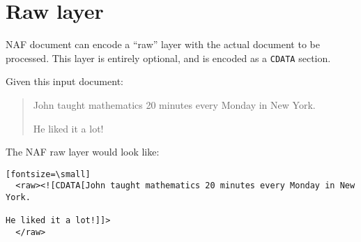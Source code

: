 
\section{Raw layer}
\label{sec:raw-layer}

NAF document can encode a ``raw'' layer with the actual document to be
processed. This layer is entirely optional, and is encoded as a
\texttt{CDATA} section.

Given this input document:
\begin{quote}
  John taught mathematics 20 minutes every Monday in New York.

  He liked it a lot!
\end{quote}

The NAF raw layer would look like:
\begin{verbatim}[fontsize=\small]
  <raw><![CDATA[John taught mathematics 20 minutes every Monday in New York.

He liked it a lot!]]>
  </raw>
\end{verbatim}


